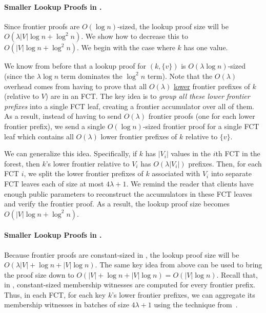 \paragraph{Smaller Lookup Proofs in \biaad.}
Since frontier proofs are $O(\log{n})$-sized, the \biaad lookup proof size will be $O(\lambda |V|\log{n}+\log^2{n})$.
We show how to decrease this to $O(|V|\log{n} + \log^2{n})$.
We begin with the case where $k$ has one value.

We know from before that a lookup proof for $(k,\{v\})$ is $O(\lambda \log{n})$-sized
(since the $\lambda\log{n}$ term dominates the $\log^2{n}$ term).
Note that the $O(\lambda)$ overhead comes from having to prove that all $O(\lambda)$ \underline{lower} frontier prefixes of $k$ (relative to $V$) are in an FCT.
The key idea is to \textit{group all these lower frontier prefixes} into a single FCT leaf, creating a frontier accumulator over all of them.
As a result, instead of having to send $O(\lambda)$ frontier proofs (one for each lower frontier prefix), we send a single $O(\log{n})$-sized frontier proof for a single FCT leaf which contains all $O(\lambda)$ lower frontier prefixes of $k$ relative to $\{v\}$.

We can generalize this idea. 
Specifically, if $k$ has $|V_i|$ values in the $i$th FCT in the forest, then $k$'s lower frontier relative to $V_i$ has $O(\lambda|V_i|)$ prefixes.
Then, for each FCT $i$, we split the lower frontier prefixes of $k$ associated with $V_i$ into separate FCT leaves each of size at most $4\lambda + 1$.
We remind the reader that clients have enough public parameters to reconstruct the accumulators in these FCT leaves and verify the frontier proof.
As a result, the lookup proof size becomes $O(|V|\log{n} + \log^2{n})$.

\aadComplexityTable

\paragraph{Smaller Lookup Proofs in \rsaaad.}
Because frontier proofs are constant-sized in \rsaaas, the \rsaaad lookup proof size will be $O(\lambda |V|+\log{n}+|V|\log{n})$.
The same key idea from above can be used to bring the proof size down to $O(|V|+\log{n} + |V|\log{n})=O(|V|\log{n})$.
Recall that, in \rsaaad, constant-sized membership witnesses are computed for every frontier prefix.
Thus, in each FCT, for each key $k$'s lower frontier prefixes, we can aggregate its membership witnesses in batches of size $4\lambda+1$ using the technique from~\cite{BBF19}.

